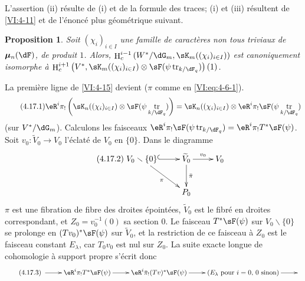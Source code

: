 \documentclass[oneside]{book}
\DeclareMathOperator{\h}{H}
\DeclareMathOperator{\tr}{tr}
\newcommand{\dmu}{{\bm\mu}}
\renewcommand{\setminus}{\smallsetminus}
\theoremstyle{sga-source}
\theoremstyle{sga-source-dash}
\theoremstyle{sga-source-dotdash}
\theoremstyle{sga-source-number-note-dash}
\theoremstyle{sga-source-note-number-dotdash}
\theoremstyle{sga-source-example-dotdash}
\theoremstyle{sga-source-inline-number}
\theoremstyle{sga-source-bare-number}
\theoremstyle{sga-source}
\newtheorem{proposition_}[subsection]{Proposition}
\newcommand{\PrintPage}[1]{}\newcommand{\MathPage}[1]{}\newcommand{\PrintCite}[2]{#1}\newcommand{\var}[3]{#1}
\begin{document}
\PrintPage{205}
L'assertion (ii) résulte de (i) et de la formule des traces; (i) et (iii) 
résultent de \ref{VI:4-11} et de l'énoncé plus géométrique suivant. 





\begin{proposition_}\label{VI:4-17}
Soit $(\chi_i)_{i\in I}$ une famille de caractères non tous triviaux de 
$\dmu_n(\dF)$, de produit $1$. Alors, 
$\h_c^{i-1}\left(W^\ast/\dG_m,\var{\sK_m((\chi_i)_{i\in I})}{\sK_n((\chi_i)_{i\in I})}{S45-SOL-0847}\right)$ est 
canoniquement isomorphe à 
\newline
$\h_c^{i+1}\left(V^\ast,\var{\sK_m((\chi_i)_{i\in I})}{\sK_n((\chi_i)_{i\in I})}{S45-SOL-0847}\otimes \sF(\psi\tr_{k/\dF_q})\right)(1)$. 
\end{proposition_}

La première ligne de \ref{VI:4-15} devient ($\pi$ comme en 
\eqref{VI:eq:4-6-1}). 
\begin{equation*}\tag{4.17.1}\label{VI:eq:4-17-1}
  \eR^i \pi_!\left(\sK_n((\chi_i)_{i\in I})\otimes \sF(\psi \tr_{k/\dF_q})\right) = \sK_n((\chi_i)_{i\in I}) \otimes \eR^i \pi_! \sF(\psi\tr_{k/\dF_q}) 
\end{equation*}
(sur $V^\ast/\dG_m$). Calculons les faisceaux 
$\eR^i\pi_! \sF(\psi\tr_{k/\dF_q}) = \eR^i \pi_! T^\ast \sF(\psi)$. Soit 
$v_0:\widetilde V_0 \to V_0$ l'éclaté de $V_0$ en $\{0\}$. Dans le 
diagramme 
\begin{equation*}\tag{4.17.2}\label{VI:eq:4-17-2}
\xymatrix{
  V_0\setminus \{0\} \ar@{^{(}->}[r] \ar[dr]_-\pi 
    & \widetilde V_0 \ar[r]^-{v_0} \ar[d]^-{\bar\pi} 
    & V_0 \\
  & P_0 
}
\end{equation*}
$\pi$ est une fibration de fibre des droites épointées, $\widetilde V_0$ 
est le fibré en droites correspondant, et $Z_0=v_0^{-1}(0)$ sa section $0$. 
Le faisceau $T^\ast\sF(\psi)$ sur $V_0\setminus \{0\}$ se prolonge en 
$(T v_0)^\ast \sF(\psi)$ sur $\widetilde V_0$, et la restriction de ce faisceau 
à $Z_0$ est le faisceau constant $E_\lambda$, car $T_0 v_0$ est nul sur 
$Z_0$. La suite exacte longue de cohomologie à support propre s'écrit 
donc 
\begin{equation*}\tag{4.17.3}\label{VI:eq:4-17-3}
\xymatrix{
  \ar[r] 
    & \eR^i \pi_! T^\ast \sF(\psi) \ar[r] 
    & \eR^i \bar\pi_! (T v)^\ast \sF(\psi) \ar[r] 
    & (E_\lambda\text{ pour $i=0$, $0$ sinon}) \ar[r] 
    & 
}
\end{equation*}
\end{document}
